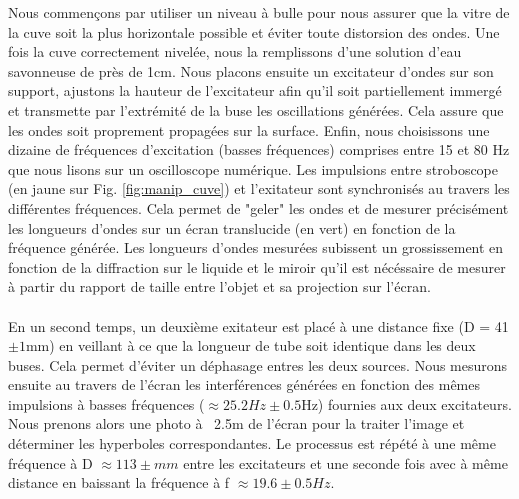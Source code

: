 Nous commençons par utiliser un niveau à bulle pour nous assurer que la vitre de la cuve soit la plus horizontale possible et éviter toute distorsion des ondes. Une fois la cuve correctement nivelée, nous la remplissons d'une solution d'eau savonneuse de près de 1cm. Nous placons ensuite un excitateur d’ondes sur son support, ajustons la hauteur de l’excitateur afin qu'il soit partiellement immergé et transmette par l'extrémité de la buse les oscillations générées. Cela assure que les ondes soit proprement propagées sur la surface. Enfin, nous choisissons une dizaine de fréquences d’excitation (basses fréquences) comprises entre 15 et 80 Hz que nous lisons sur un oscilloscope numérique. Les impulsions entre stroboscope (en jaune sur Fig. \ref{fig:manip_cuve}) et l'exitateur sont synchronisés au travers les différentes fréquences. Cela permet de "geler" les ondes et de mesurer précisément les longueurs d’ondes sur un écran translucide (en vert) en fonction de la fréquence générée. Les longueurs d'ondes mesurées subissent un grossissement en fonction de la diffraction sur le liquide et le miroir qu'il est nécéssaire de mesurer à partir du rapport de taille entre l'objet et sa projection sur l'écran.
\\\\
En un second temps, un deuxième exitateur est placé à une distance fixe (D = 41 $\pm 1 $mm) en veillant à ce que la longueur de tube soit identique dans les deux buses. Cela permet d'éviter un déphasage entres les deux sources. Nous mesurons ensuite au travers de l'écran les interférences générées en fonction des mêmes impulsions à basses fréquences ($\approx 25.2Hz \pm 0.5 $Hz) fournies aux deux excitateurs. Nous prenons alors une photo à ~2.5m de l'écran pour la traiter l'image et déterminer les hyperboles correspondantes. Le processus est répété à une même fréquence à D $\approx 113 \pm mm$ entre les excitateurs  et une seconde fois avec à même distance en baissant la fréquence à f $\approx 19.6 \pm 0.5 Hz$.
